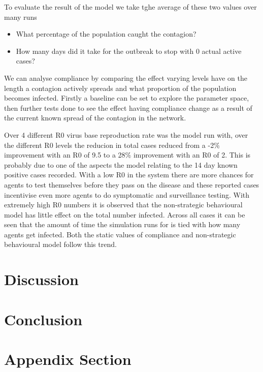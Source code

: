 \documentclass{article}
\begin{document}
To evaluate the result of the model we take tghe average of these two values over many runs 
\begin{itemize}
\item What percentage of the population caught the contagion?
\item How many days did it take for the outbreak to stop with 0 actual active cases?
\end{itemize}

We can analyse compliance by comparing the effect varying levels have on the length a contagion actively spreads and what proportion of the population becomes infected. Firstly a baseline can be set to explore the parameter space, then further tests done to see the effect having compliance change as a result of the current known spread of the contagion in the network.


Over 4 different R0 virus base reproduction rate was the model run with, over the different R0 levels the reducion in total cases reduced from a -2\% improvement with an R0 of 9.5 to a 28\% improvement with an R0 of 2. This is probably due to one of the aspects the model relating to the 14 day known positive cases recorded. With a low R0 in the system there are more chances for agents to test themselves before they pass on the disease and these reported cases incentivise even more agents to do symptomatic and surveillance testing. With extremely high R0 numbers it is observed that the non-strategic behavioural model has little effect on the total number infected. Across all cases it can be seen that the amount of time the simulation runs for is tied with how many agents get infected. Both the static values of compliance and non-strategic behavioural model follow this trend. 


\section{Discussion}

\section{Conclusion}

\newpage
\appendix

\section{Appendix Section}
\end{document}
